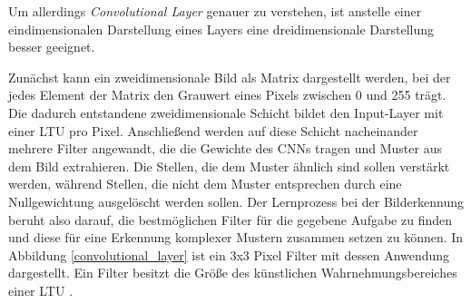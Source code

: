 Um allerdings \textit{Convolutional Layer} genauer zu verstehen, ist anstelle einer eindimensionalen Darstellung eines Layers eine dreidimensionale Darstellung besser geeignet.

Zunächst kann ein zweidimensionale Bild als Matrix dargestellt werden, bei der jedes Element der Matrix den Grauwert eines Pixels zwischen 0 und 255 trägt. Die dadurch entstandene zweidimensionale Schicht bildet den Input-Layer mit einer LTU pro Pixel. Anschließend werden auf diese Schicht nacheinander mehrere Filter angewandt, die die Gewichte des CNNs tragen und Muster aus dem Bild extrahieren. Die Stellen, die dem Muster ähnlich sind sollen verstärkt werden, während Stellen, die nicht dem Muster entsprechen durch eine Nullgewichtung ausgelöscht werden sollen. Der Lernprozess bei der Bilderkennung beruht also darauf, die bestmöglichen Filter für die gegebene Aufgabe zu finden und diese für eine Erkennung komplexer Mustern zusammen setzen zu können. In Abbildung \ref{convolutional_layer} ist ein 3x3 Pixel Filter mit dessen Anwendung dargestellt. Ein Filter besitzt die Größe des künstlichen Wahrnehmungsbereiches einer LTU \cite{AurelienGeron.2018}.

